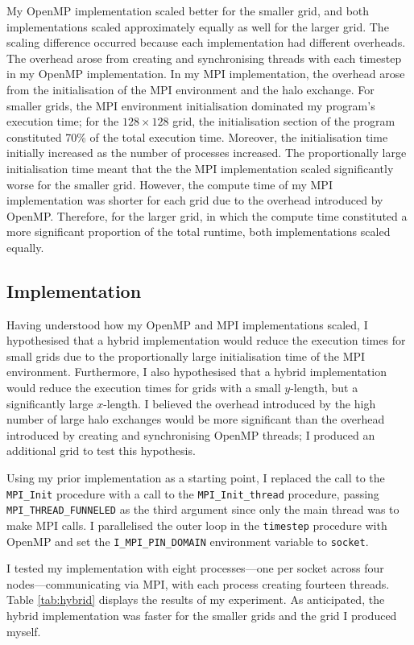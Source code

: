 \documentclass[twocolumn, a4paper]{article}
\begin{document}
My OpenMP implementation scaled better for the smaller grid, and both implementations scaled approximately equally as well for the larger grid.
The scaling difference occurred because each implementation had different overheads.
The overhead arose from creating and synchronising threads with each timestep in my OpenMP implementation.
In my MPI implementation, the overhead arose from the initialisation of the MPI environment and the halo exchange.
For smaller grids, the MPI environment initialisation dominated my program's execution time; for the $128 \times 128$ grid, the initialisation section of the program constituted 70\% of the total execution time.
Moreover, the initialisation time initially increased as the number of processes increased.
The proportionally large initialisation time meant that the the MPI implementation scaled significantly worse for the smaller grid.
However, the compute time of my MPI implementation was shorter for each grid due to the overhead introduced by OpenMP.
Therefore, for the larger grid, in which the compute time constituted a more significant proportion of the total runtime, both implementations scaled equally.

\subsection{Implementation}

Having understood how my OpenMP and MPI implementations scaled, I hypothesised that a hybrid implementation would reduce the execution times for small grids due to the proportionally large initialisation time of the MPI environment.
Furthermore, I also hypothesised that a hybrid implementation would reduce the execution times for grids with a small $y$-length, but a significantly large $x$-length.
I believed the overhead introduced by the high number of large halo exchanges would be more significant than the overhead introduced by creating and synchronising OpenMP threads; I produced an additional grid to test this hypothesis.

Using my prior implementation as a starting point, I replaced the call to the \texttt{MPI\_Init} procedure with a call to the \texttt{MPI\_Init\_thread} procedure, passing \texttt{MPI\_THREAD\_FUNNELED} as the third argument since only the main thread was to make MPI calls.
I parallelised the outer loop in the \texttt{timestep} procedure with OpenMP and set the \texttt{I\_MPI\_PIN\_DOMAIN} environment variable to \texttt{socket}.

I tested my implementation with eight processes---one per socket across four nodes---communicating via MPI, with each process creating fourteen threads.
Table \ref{tab:hybrid} displays the results of my experiment.
As anticipated, the hybrid implementation was faster for the smaller grids and the grid I produced myself.
\end{document}
